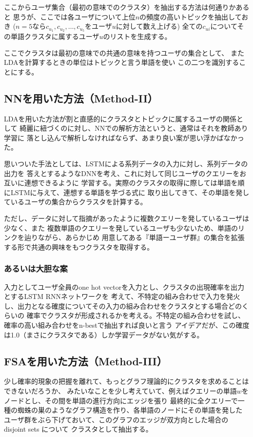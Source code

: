 \documentclass[uplatex]{jsarticle}
\begin{document}
ここからユーザ集合（最初の意味でのクラスタ）を抽出する方法は何通りかあると
思うが、ここでは各ユーザについて上位$n$の頻度の高いトピックを抽出しておき
($n=5なら c_{u_1}, c_{u_2}, \ldots, c_{u_5}$をユーザ$u$に対して数え上げる)
全ての$c_{ui}$についてその単語クラスタに属するユーザ$u$のリストを生成する。

ここでクラスタは最初の意味での共通の意味を持つユーザの集合として、
またLDAを計算するときの単位はトピックと言う単語を使い
この二つを識別することにする。

\subsection{NNを用いた方法（Method-II）}
LDAを用いた方法が割と直感的にクラスタとトピックに属するユーザの関係として
綺麗に紐づくのに対し、NNでの解析方法というと、通常はそれを教師あり学習に
落とし込んで解析しなければならず、あまり良い案が思い浮かばなかった。

思いついた手法としては、LSTMによる系列データの入力に対し、系列データの出力を
答えとするようなDNNを考え、これに対して同じユーザのクエリーをお互いに連想できるように
学習する。実際のクラスタの取得に際しては単語を順にLSTMに与えて、連想する単語を芋づる式に
取り出してきて、その単語を発しているユーザの集合からクラスタを計算する。

ただし、データに対して指摘があったように複数クエリーを発しているユーザは少なく、また
複数単語のクエリーを発しているユーザも少ないため、単語のリンクを辿りながら、あらかじめ
用意してある『単語ーユーザ群』の集合を拡張する形で共通の興味をもつクラスタを取得する。


\subsubsection{あるいは大胆な案}
入力としてユーザ全員のone hot vectorを入力とし、クラスタの出現確率を出力とするLSTM RNNネットワークを
考えて、不特定の組み合わせで入力を発火し、出力となる確度についてその入力の組み合わせをクラスタとする場合どのくらいの
確率でクラスタが形成されるかを考える。不特定の組み合わせを試し、確率の高い組み合わせをn-bestで抽出すれば良いと言う
アイデアだが、この確度は1.0（まさにクラスタである）しか学習データがない気がする。

\subsection{FSAを用いた方法（Method-III）}
少し確率的現象の把握を離れて、もっとグラフ理論的にクラスタを求めることはできないだろうか、
みたいなことを少し考えていて、例えばクエリーの単語$w$をノードとし、その間を単語の進行方向にエッジを張り
最終的に全クエリーで一種の蜘蛛の巣のようなグラフ構造を作り、各単語のノードにその単語を発した
ユーザ群をぶら下げておいて、このグラフのエッジが双方向とした場合のdisjoint sets について
クラスタとして抽出する。
\end{document}
